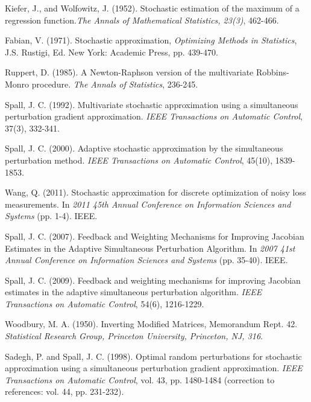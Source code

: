 \documentclass[conference,10.3cpt]{IEEEtran}
\newcommand{\remove}[1]{}
\begin{document}
\begin{thebibliography}{1}
	
	Kiefer, J., and Wolfowitz, J. (1952). Stochastic estimation of the maximum of a regression function.\textit{The Annals of Mathematical Statistics, 23(3)}, 462-466.
	
	Fabian, V. (1971). Stochastic approximation, \textit{Optimizing Methods in Statistics}, J.S. Rustigi, Ed. New York: Academic Press, pp. 439-470.
	
	Ruppert, D. (1985). A Newton-Raphson version of the multivariate Robbins-Monro procedure. \textit{The Annals of Statistics}, 236-245.

 Spall, J. C. (1992). Multivariate
  stochastic approximation using a simultaneous perturbation gradient
  approximation. \textit{IEEE Transactions on Automatic Control},
  37(3), 332-341.

 Spall, J. C. (2000). Adaptive
  stochastic approximation by the simultaneous perturbation
  method. \textit{IEEE Transactions on Automatic Control}, 45(10),
  1839-1853.


Wang, Q. (2011). Stochastic approximation for discrete optimization of noisy loss measurements. In \textit{2011 45th Annual Conference on Information Sciences and Systems} (pp. 1-4).  IEEE.



Spall, J. C. (2007). Feedback and Weighting Mechanisms for Improving Jacobian Estimates in the Adaptive Simultaneous Perturbation Algorithm. In \textit{2007 41st Annual Conference on Information Sciences and Systems} (pp. 35-40). IEEE.


 Spall, J. C. (2009). Feedback and
  weighting mechanisms for improving Jacobian estimates in the adaptive
  simultaneous perturbation algorithm. \textit{IEEE Transactions on Automatic Control}, 54(6), 1216-1229.


 Woodbury,
  M. A. (1950). Inverting Modified Matrices, Memorandum
  Rept. 42. \textit{Statistical Research Group, Princeton University,
    Princeton, NJ, 316}.

\remove {	\bibitem{Bar-Itzhack1998} Bar-Itzhack,
	I.Y. (1998). Matrix symmetrization. \textit{Journal of guidance,
		control, and dynamics}, 21(1), 178-179.	}


 Sadegh, P. and Spall,
  J. C. (1998). Optimal random perturbations for stochastic
  approximation using a simultaneous perturbation gradient
  approximation. \textit{IEEE Transactions on Automatic Control}, vol. 43, pp. 1480-1484 (correction to references: vol. 44, pp. 231-232).


\end{thebibliography}
\end{document}
